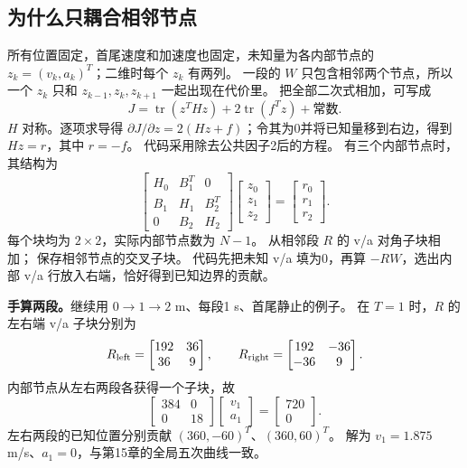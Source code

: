 \subsection{为什么只耦合相邻节点}
所有位置固定，首尾速度和加速度也固定，未知量为各内部节点的
$z_k=(v_k,a_k)^T$；二维时每个 $z_k$ 有两列。
一段的 $W$ 只包含相邻两个节点，所以一个 $z_k$ 只和 $z_{k-1},z_k,z_{k+1}$ 一起出现在代价里。
把全部二次式相加，可写成
\[
 J=\operatorname{tr}(z^THz)+2\operatorname{tr}(f^Tz)+\text{常数}.
\]
$H$ 对称。逐项求导得 $\partial J/\partial z=2(Hz+f)$；令其为0并将已知量移到右边，得到 $Hz=r$，其中 $r=-f$。
代码采用除去公共因子2后的方程。
有三个内部节点时，其结构为
\begin{equation}
 \begin{bmatrix}H_0&B_1^T&0\\B_1&H_1&B_2^T\\0&B_2&H_2\end{bmatrix}
 \begin{bmatrix}z_0\\z_1\\z_2\end{bmatrix}
 =\begin{bmatrix}r_0\\r_1\\r_2\end{bmatrix}.
 \label{eq:spline-block-system}
\end{equation}
每个块均为 $2\times2$，实际内部节点数为 $N-1$。
 从相邻段 $R$ 的 v/a 对角子块相加； 保存相邻节点的交叉子块。
代码先把未知 v/a 填为0，再算 $-RW$，选出内部 v/a 行放入右端，恰好得到已知边界的贡献。

\textbf{手算两段。}继续用 $0\to1\to2$ m、每段1 s、首尾静止的例子。
在 $T=1$ 时，$R$ 的左右端 v/a 子块分别为
\[
 R_{\rm left}=\begin{bmatrix}192&36\\36&9\end{bmatrix},\qquad
 R_{\rm right}=\begin{bmatrix}192&-36\\-36&9\end{bmatrix}.
\]
内部节点从左右两段各获得一个子块，故
\[
 \begin{bmatrix}384&0\\0&18\end{bmatrix}\begin{bmatrix}v_1\\a_1\end{bmatrix}
 =\begin{bmatrix}720\\0\end{bmatrix}.
\]
左右两段的已知位置分别贡献 $(360,-60)^T$、$(360,60)^T$。
解为 $v_1=1.875$ m/s、$a_1=0$，与第15章的全局五次曲线一致。

